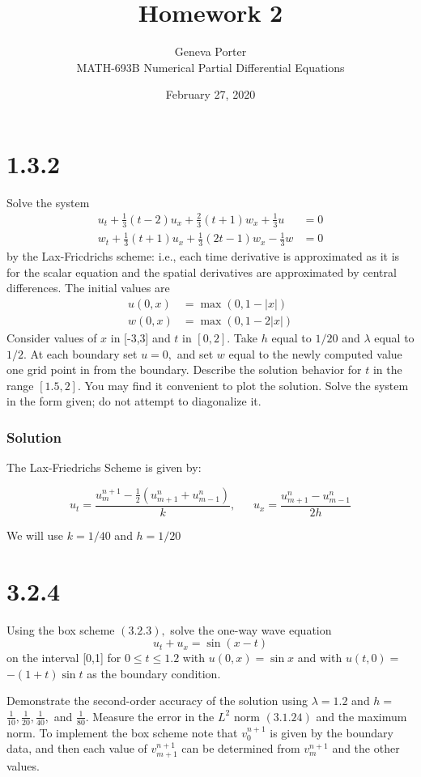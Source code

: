 \documentclass[12pt]{article}
\title{Homework 2}
\author{Geneva Porter\\ 
MATH-693B Numerical Partial Differential Equations\\}
\date{February 27, 2020}
\begin{document}
\maketitle

\section*{1.3.2}

Solve the system
$$
\begin{aligned}
u_{t}+\frac{1}{3}(t-2) u_{x}+\frac{2}{3}(t+1) w_{x}+\frac{1}{3} u &=0 \\
w_{t}+\frac{1}{3}(t+1) u_{x}+\frac{1}{3}(2 t-1) w_{x}-\frac{1}{3} w &=0
\end{aligned}
$$
by the Lax-Fricdrichs scheme: i.e., each time derivative is approximated as it is for the scalar equation and the spatial derivatives are approximated by central differences. The initial values are
$$
\begin{aligned}
u(0, x) &=\max (0,1-|x|) \\
w(0, x) &=\max (0,1-2|x|)
\end{aligned}
$$
Consider values of $x$ in [-3,3] and $t$ in $[0,2] .$ Take $h$ equal to $1 / 20$ and $\lambda$ equal
to $1 / 2 .$ At each boundary set $u=0,$ and set $w$ equal to the newly computed value one grid point in from the boundary. Describe the solution behavior for $t$ in the range $[1.5,2] .$ You may find it convenient to plot the solution. Solve the system in the form given; do not attempt to diagonalize it.


\subsubsection*{Solution}

The Lax-Friedrichs Scheme is given by:

$$ u_t = \frac{u^{n+1}_m - \frac{1}{2}\left(u^n_{m+1}+u^n_{m-1}\right)}{k}, ~~~~~~~ u_x = \frac{u_{m+1}^n - u_{m-1}^n}{2h}$$

We will use $k=1/40$ and $h=1/20$



\section*{3.2.4}

Using the box scheme $(3.2 .3),$ solve the one-way wave equation
$$
u_{t}+u_{x}=\sin (x-t)
$$
on the interval [0,1] for $0 \leq t \leq 1.2$ with $u(0, x)=\sin x$ and with $u(t, 0)=$ $-(1+t) \sin t$ as the boundary condition.

Demonstrate the second-order accuracy of the solution using $\lambda=1.2$ and $h=$ $\frac{1}{10}, \frac{1}{20}, \frac{1}{40},$ and $\frac{1}{80} .$ Measure the error in the $L^{2}$ norm $(3.1 .24)$ and the maximum norm. To implement the box scheme note that $v_{0}^{n+1}$ is given by the boundary data, and then each value of $v_{m+1}^{n+1}$ can be determined from $v_{m}^{n+1}$ and the other values.
\end{document}
